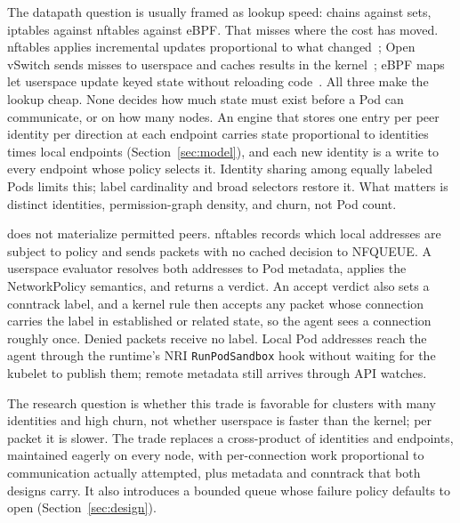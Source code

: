 The datapath question is usually framed as lookup speed: chains against
sets, iptables against nftables against eBPF. That misses where the cost
has moved. nftables applies incremental updates proportional to what
changed~\cite{winship2025nftables}; Open vSwitch sends misses to userspace
and caches results in the kernel~\cite{pfaff2015ovs}; eBPF maps let
userspace update keyed state without reloading code~\cite{linuxbpfmaps}.
All three make the lookup cheap. None decides how much state must exist
before a Pod can communicate, or on how many nodes. An engine that stores
one entry per peer identity per direction at each endpoint carries state
proportional to identities times local endpoints
(Section~\ref{sec:model}), and each new identity is a write to every
endpoint whose policy selects it. Identity sharing among equally labeled
Pods limits this; label cardinality and broad selectors restore it. What
matters is distinct identities, permission-graph density, and churn, not
Pod count.

\sys{} does not materialize permitted peers. nftables records which local
addresses are subject to policy and sends packets with no cached decision
to NFQUEUE. A userspace evaluator resolves both addresses to Pod metadata,
applies the NetworkPolicy semantics, and returns a verdict. An accept
verdict also sets a conntrack label, and a kernel rule then accepts any
packet whose connection carries the label in established or related
state, so the agent sees a connection roughly once. Denied packets
receive no label. Local Pod addresses reach the agent through the
runtime's NRI \texttt{RunPodSandbox} hook without waiting for the kubelet
to publish them; remote metadata still arrives through API watches.

The research question is whether this trade is favorable for clusters
with many identities and high churn, not whether userspace is faster than
the kernel; per packet it is slower. The trade replaces a cross-product
of identities and endpoints, maintained eagerly on every node, with
per-connection work proportional to communication actually attempted,
plus metadata and conntrack that both designs carry. It also introduces a
bounded queue whose failure policy defaults to open
(Section~\ref{sec:design}).

